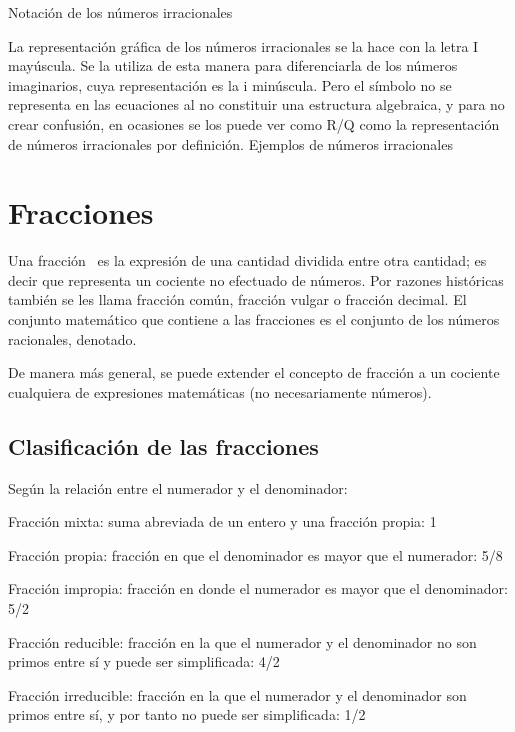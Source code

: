 \documentclass{article}
\begin{document}
\bigskip


\bigskip

Notaci\'on de los n\'umeros irracionales

La representaci\'on gr\'afica de los n\'umeros irracionales se la hace con la letra I may\'uscula. Se la utiliza de esta manera para diferenciarla de los n\'umeros imaginarios, cuya representaci\'on es la i min\'uscula. Pero el s\'imbolo no se representa en las ecuaciones al no constituir una estructura algebraica, y para no crear confusi\'on, en ocasiones se los puede ver como R/Q como la representaci\'on de n\'umeros irracionales por definici\'on. Ejemplos de n\'umeros irracionales

\section[Fracciones]{Fracciones}

\bigskip

Una fracci\'on \ es la expresi\'on de una cantidad dividida entre otra cantidad; es decir que representa un cociente no efectuado de n\'umeros. Por razones hist\'oricas tambi\'en se les llama fracci\'on com\'un, fracci\'on vulgar o fracci\'on decimal. El conjunto matem\'atico que contiene a las fracciones es el conjunto de los n\'umeros racionales, denotado.

De manera m\'as general, se puede extender el concepto de fracci\'on a un cociente cualquiera de expresiones matem\'aticas (no necesariamente n\'umeros).

\subsection[Clasificaci\'on de las fracciones]{Clasificaci\'on de las fracciones}

\bigskip

Seg\'un la relaci\'on entre el numerador y el denominador:

Fracci\'on mixta: suma abreviada de un entero y una fracci\'on propia: 1 {\textonequarter}

Fracci\'on propia: fracci\'on en que el denominador es mayor que el numerador: 5/8

Fracci\'on impropia: fracci\'on en donde el numerador es mayor que el denominador: 5/2

Fracci\'on reducible: fracci\'on en la que el numerador y el denominador no son primos entre s\'i y puede ser simplificada: 4/2

Fracci\'on irreducible: fracci\'on en la que el numerador y el denominador son primos entre s\'i, y por tanto no puede ser simplificada: 1/2
\end{document}
